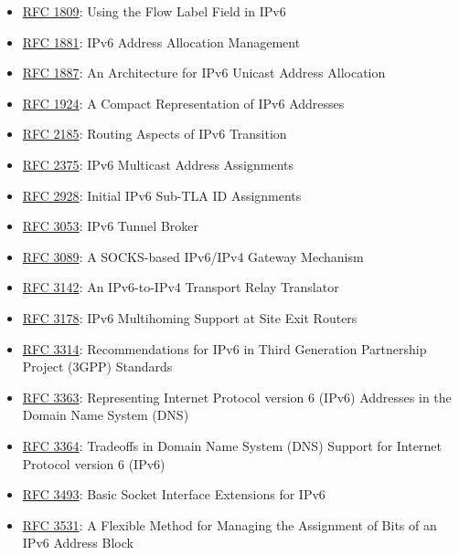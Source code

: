 \documentclass[
]{article}
\providecommand{\tightlist}{%
  \setlength{\itemsep}{0pt}\setlength{\parskip}{0pt}}
\begin{document}
\begin{itemize}
\tightlist
\item
  \href{https://www.rfc-editor.org/info/rfc1809}{RFC 1809}: Using the
  Flow Label Field in IPv6
\item
  \href{https://www.rfc-editor.org/info/rfc1881}{RFC 1881}: IPv6 Address
  Allocation Management
\item
  \href{https://www.rfc-editor.org/info/rfc1887}{RFC 1887}: An
  Architecture for IPv6 Unicast Address Allocation
\item
  \href{https://www.rfc-editor.org/info/rfc1924}{RFC 1924}: A Compact
  Representation of IPv6 Addresses
\item
  \href{https://www.rfc-editor.org/info/rfc2185}{RFC 2185}: Routing
  Aspects of IPv6 Transition
\item
  \href{https://www.rfc-editor.org/info/rfc2375}{RFC 2375}: IPv6
  Multicast Address Assignments
\item
  \href{https://www.rfc-editor.org/info/rfc2928}{RFC 2928}: Initial IPv6
  Sub-TLA ID Assignments
\item
  \href{https://www.rfc-editor.org/info/rfc3053}{RFC 3053}: IPv6 Tunnel
  Broker
\item
  \href{https://www.rfc-editor.org/info/rfc3089}{RFC 3089}: A
  SOCKS-based IPv6/IPv4 Gateway Mechanism
\item
  \href{https://www.rfc-editor.org/info/rfc3142}{RFC 3142}: An
  IPv6-to-IPv4 Transport Relay Translator
\item
  \href{https://www.rfc-editor.org/info/rfc3178}{RFC 3178}: IPv6
  Multihoming Support at Site Exit Routers
\item
  \href{https://www.rfc-editor.org/info/rfc3314}{RFC 3314}:
  Recommendations for IPv6 in Third Generation Partnership Project
  (3GPP) Standards
\item
  \href{https://www.rfc-editor.org/info/rfc3363}{RFC 3363}: Representing
  Internet Protocol version 6 (IPv6) Addresses in the Domain Name System
  (DNS)
\item
  \href{https://www.rfc-editor.org/info/rfc3364}{RFC 3364}: Tradeoffs in
  Domain Name System (DNS) Support for Internet Protocol version 6
  (IPv6)
\item
  \href{https://www.rfc-editor.org/info/rfc3493}{RFC 3493}: Basic Socket
  Interface Extensions for IPv6
\item
  \href{https://www.rfc-editor.org/info/rfc3531}{RFC 3531}: A Flexible
  Method for Managing the Assignment of Bits of an IPv6 Address Block

\end{itemize}
\end{document}
